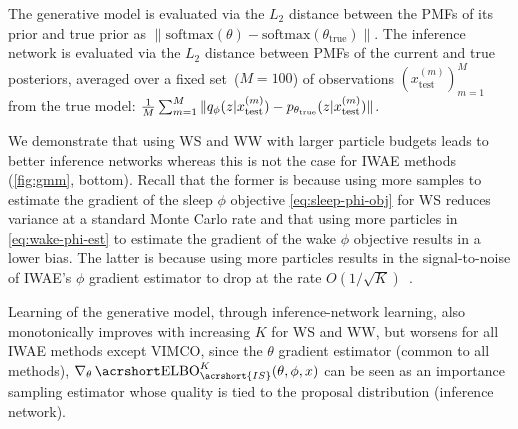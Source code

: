 The generative model is evaluated via the $L_2$ distance between the \glspl{PMF} of its prior and true prior as $\|\mathrm{softmax}(\theta) - \mathrm{softmax}(\theta_\text{true})\|$.
The inference network is evaluated via the $L_2$ distance between \glspl{PMF} of the current and true posteriors, averaged over a fixed set~(\(M=100\)) of observations $(x_{\text{test}}^{(m)})_{m = 1}^{M}$ from the true model: $\frac{1}{M} \sum_{m = 1}^M \|q_\phi(z \lvert x_{\text{test}}^{(m)}) - p_{\theta_{\text{true}}}(z \lvert x_{\text{test}}^{(m)})\|$.

We demonstrate that using \gls{WS} and \gls{WW} with larger particle budgets leads to better inference networks whereas this is not the case for \gls{IWAE} methods (\cref{fig:gmm}, bottom).
Recall that the former is because using more samples to estimate the gradient of the sleep $\phi$ objective \cref{eq:sleep-phi-obj} for \gls{WS} reduces variance at a standard Monte Carlo rate and that using more particles in \cref{eq:wake-phi-est} to estimate the gradient of the wake $\phi$ objective results in a lower bias.
The latter is because using more particles results in the signal-to-noise of \gls{IWAE}'s $\phi$ gradient estimator to drop at the rate $O(1 / \sqrt{K})$~\citep{rainforth2018tighter}.

Learning of the generative model, through inference-network learning, also monotonically improves with increasing \(K\) for \gls{WS} and \gls{WW}, but worsens for all \gls{IWAE} methods except \gls{VIMCO}, since the $\theta$ gradient estimator (common to all methods), $\nabla_\theta \ELBO_{\acrshort{IS}}^K(\theta, \phi, x)$ can be seen as an importance sampling estimator whose quality is tied to the proposal distribution (inference network).

